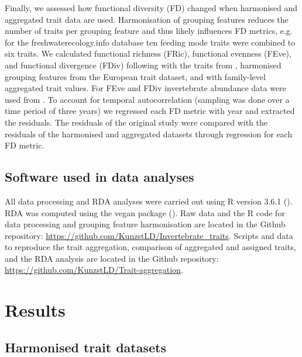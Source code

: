 \documentclass[12pt]{article}
\begin{document}
Finally, we assessed how functional diversity (FD) changed when harmonised and aggregated trait data are used. Harmonisation of grouping features reduces the number of traits per grouping feature and thus likely influences FD metrics, e.g. for the freshwaterecology.info database ten feeding mode traits were combined to six traits. We calculated functional richness (FRic), functional evenness (FEve), and functional divergence (FDiv) following \citet{villegerNewMultidimensionalFunctional2008a} with the traits from \citet{szocs_effects_2014}, harmonised grouping features from the European trait dataset, and with family-level aggregated trait values. For FEve and FDiv invertebrate abundance data were used from \citet{szocs_effects_2014}. To account for temporal autocorrelation (sampling was done over a time period of three years) we regressed each FD metric with year and extracted the residuals. The residuals of the original study were compared with the residuals of the harmonised and aggregated datasets through regression for each FD metric.


\subsection*{Software used in data analyses}

All data processing and RDA analyses were carried out using R version 3.6.1 (\cite{cite_R}). RDA was computed using the vegan package (\cite{cite_vegan}). Raw data and the R code for data processing and grouping feature harmonisation are located in the Github repository: \url{https://github.com/KunzstLD/Invertebrate_traits}. Scripts and data to reproduce the trait aggregation, comparison of aggregated and assigned traits, and the RDA analysis are located in the Github repository: \url{https://github.com/KunzstLD/Trait-aggregation}.

\newpage


\section*{Results}

\subsection*{Harmonised trait datasets}
\end{document}
